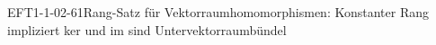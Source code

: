 
\begin{PROP}{EFT1-1-02-61}{Rang-Satz für Vektorraumhomomorphismen: Konstanter Rang impliziert ker und im sind Untervektorraumbündel}
\end{PROP}
